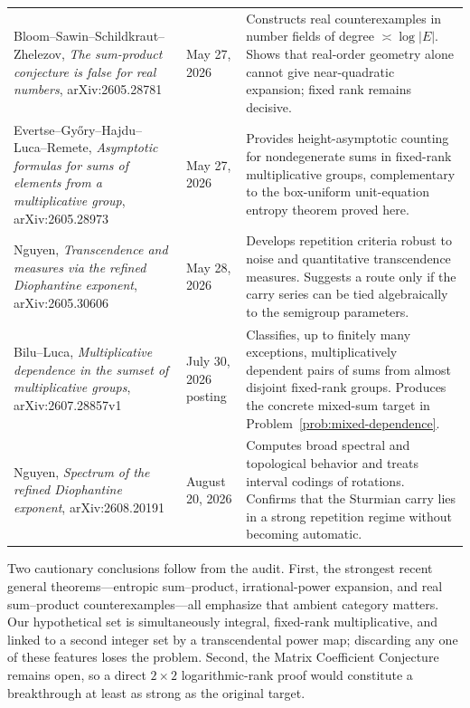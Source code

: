 \documentclass[11pt,oneside]{article}
\theoremstyle{definition}
\theoremstyle{remark}
\newcommand{\abs}[1]{\left|#1\right|}
\begin{document}
\begin{longtable}{p{}p{}p{}}
Bloom--Sawin--Schildkraut--Zhelezov, \emph{The sum-product conjecture is false for real numbers}, arXiv:2605.28781 \cite{BloomEtAl2026} & May 27, 2026 & Constructs real counterexamples in number fields of degree \(\asymp\log\abs E\).  Shows that real-order geometry alone cannot give near-quadratic expansion; fixed rank remains decisive.\\
Evertse--Gy\H{o}ry--Hajdu--Luca--Remete, \emph{Asymptotic formulas for sums of elements from a multiplicative group}, arXiv:2605.28973 \cite{EvertseEtAl2026} & May 27, 2026 & Provides height-asymptotic counting for nondegenerate sums in fixed-rank multiplicative groups, complementary to the box-uniform unit-equation entropy theorem proved here.\\
Nguyen, \emph{Transcendence and measures via the refined Diophantine exponent}, arXiv:2605.30606 \cite{Nguyen2026a} & May 28, 2026 & Develops repetition criteria robust to noise and quantitative transcendence measures.  Suggests a route only if the carry series can be tied algebraically to the semigroup parameters.\\
Bilu--Luca, \emph{Multiplicative dependence in the sumset of multiplicative groups}, arXiv:2607.28857v1 \cite{BiluLuca2026} & July 30, 2026 posting & Classifies, up to finitely many exceptions, multiplicatively dependent pairs of sums from almost disjoint fixed-rank groups.  Produces the concrete mixed-sum target in Problem~\ref{prob:mixed-dependence}.\\
Nguyen, \emph{Spectrum of the refined Diophantine exponent}, arXiv:2608.20191 \cite{Nguyen2026b} & August 20, 2026 & Computes broad spectral and topological behavior and treats interval codings of rotations.  Confirms that the Sturmian carry lies in a strong repetition regime without becoming automatic.\\
\bottomrule
\end{longtable}

Two cautionary conclusions follow from the audit.  First, the strongest recent general theorems---entropic sum--product, irrational-power expansion, and real sum--product counterexamples---all emphasize that ambient category matters.  Our hypothetical set is simultaneously integral, fixed-rank multiplicative, and linked to a second integer set by a transcendental power map; discarding any one of these features loses the problem.  Second, the Matrix Coefficient Conjecture remains open, so a direct \(2\times2\) logarithmic-rank proof would constitute a breakthrough at least as strong as the original target.
\end{document}
